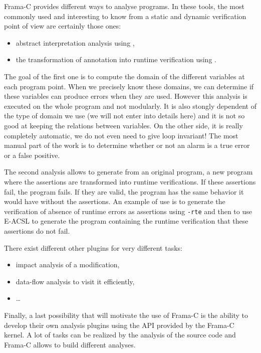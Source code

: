 



Frama-C provides different ways to analyse programs. In these tools, the
most commonly used and interesting to know from a static and dynamic
verification point of view are certainly those ones:

\begin{itemize}
\item abstract interpretation analysis using
,
\item the transformation of annotation into runtime verification using
.
\end{itemize}

The goal of the first one is to compute the domain of the different
variables at each program point. When we precisely know these domains,
we can determine if these variables can produce errors when they are
used. However this analysis is executed on the whole program and not
modularly. It is also stongly dependent of the type of domain we use (we
will not enter into details here) and it is not so good at keeping the
relations between variables. On the other side, it is really completely
automatic, we do not even need to give loop invariant! The most manual
part of the work is to determine whether or not an alarm is a true error
or a false positive.

The second analysis allows to generate from an original program, a new
program where the assertions are transformed into runtime verifications.
If these assertions fail, the program fails. If they are valid, the
program has the same behavior it would have without the assertions. An
example of use is to generate the verification of absence of runtime
errors as assertions using \texttt{-rte} and then to use E-ACSL to
generate the program containing the runtime verification that these
assertions do not fail.

There exist different other plugins for very different tasks:

\begin{itemize}
\item impact analysis of a modification,
\item data-flow analysis to visit it efficiently,
\item \ldots{}
\end{itemize}

Finally, a last possibility that will motivate the use of Frama-C is the
ability to develop their own analysis plugins using the API provided by
the Frama-C kernel. A lot of tasks can be realized by the analysis of
the source code and Frama-C allows to build different analyses.


